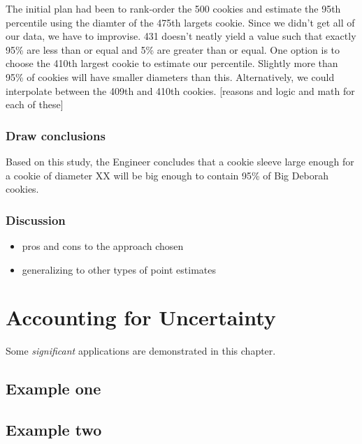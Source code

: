 \documentclass[
]{book}
\providecommand{\tightlist}{%
  \setlength{\itemsep}{0pt}\setlength{\parskip}{0pt}}
\theoremstyle{definition}
\theoremstyle{definition}
\theoremstyle{definition}
\theoremstyle{remark}
\begin{document}
The initial plan had been to rank-order the 500 cookies and estimate the 95th percentile using the diamter of the 475th largets cookie. Since we didn't get all of our data, we have to improvise. 431 doesn't neatly yield a value such that exactly 95\% are less than or equal and 5\% are greater than or equal. One option is to choose the 410th largest cookie to estimate our percentile. Slightly more than 95\% of cookies will have smaller diameters than this. Alternatively, we could interpolate between the 409th and 410th cookies. {[}reasons and logic and math for each of these{]}

\hypertarget{draw-conclusions}{%
\subsection{Draw conclusions}\label{draw-conclusions}}

Based on this study, the Engineer concludes that a cookie sleeve large enough for a cookie of diameter XX will be big enough to contain 95\% of Big Deborah cookies.

\hypertarget{discussion}{%
\subsection{Discussion}\label{discussion}}

\begin{itemize}
\tightlist
\item
  pros and cons to the approach chosen
\item
  generalizing to other types of point estimates
\end{itemize}

\hypertarget{accounting-for-uncertainty}{%
\chapter{Accounting for Uncertainty}\label{accounting-for-uncertainty}}

Some \emph{significant} applications are demonstrated in this chapter.

\hypertarget{example-one}{%
\section{Example one}\label{example-one}}

\hypertarget{example-two}{%
\section{Example two}\label{example-two}}
\end{document}
